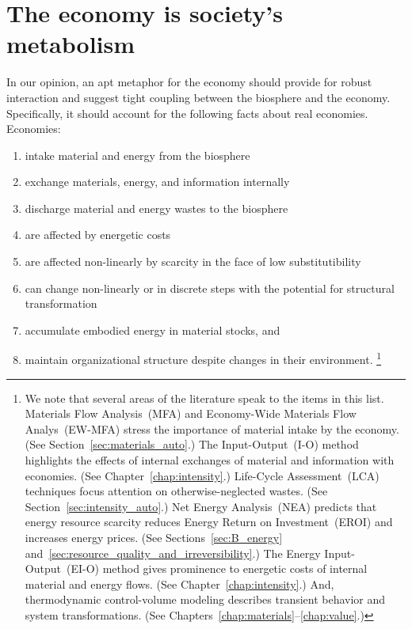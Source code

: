 \section{The economy is society's metabolism}
\label{sec:economy_metabolism}

In our opinion, an apt metaphor for the economy should provide for robust interaction
and suggest tight coupling between the biosphere and the economy. 
Specifically, it should account for the following facts about real economies. 
Economies:

\begin{enumerate}
	\item{\label{itm:intake}intake material and energy from the biosphere}
	\item{\label{itm:internal_exchange}exchange materials, energy, and information internally}
	\item{\label{itm:discharge}discharge material and energy wastes to the biosphere}
	\item{\label{itm:energetic_costs}are affected by energetic costs}
	\item{\label{itm:scarcity}are affected non-linearly by scarcity 
			in the face of low substitutibility}
	\item{\label{itm:non-linear}can change non-linearly or in discrete steps with the potential 
			for structural transformation}
	\item{\label{itm:embodies}accumulate embodied energy in material stocks, and}
	\item{\label{itm:robust}maintain organizational structure despite changes 
			in their environment.%
				\footnote{We note that 
				several areas of the literature speak to the items in this list.
				Materials Flow Analysis~(MFA) and 
				Economy-Wide Materials Flow Analys~(EW-MFA)
				stress the importance of
				material intake by the economy. 
				(See Section~\ref{sec:materials_auto}.)
				The Input-Output~(I-O) method highlights the effects of internal exchanges
				of material and information with economies. 
				(See Chapter~\ref{chap:intensity}.)
				Life-Cycle Assessment~(LCA) techniques focus attention 
				on otherwise-neglected wastes. 
				(See Section~\ref{sec:intensity_auto}.)
				Net Energy Analysis~(NEA) predicts that energy resource 
				scarcity reduces Energy Return on Investment~(EROI)
				and increases energy prices.
				(See Sections~\ref{sec:B_energy} 
				and~\ref{sec:resource_quality_and_irreversibility}.)
				The Energy Input-Output~(EI-O) method gives prominence to energetic costs
				of internal material and energy flows.
				(See Chapter~\ref{chap:intensity}.)
				And, thermodynamic control-volume modeling describes
				transient behavior and system transformations.
				(See Chapters~\ref{chap:materials}--\ref{chap:value}.)
			}}
\end{enumerate}

